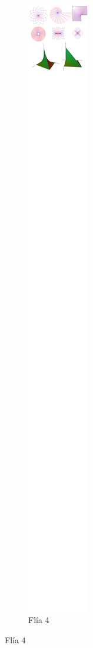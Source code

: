 \begin{figure}[t!]
~
\begin{subfigure}[t]{0.5\textwidth}
\centering
\includegraphics[scale=0.5,trim={10px 9612px 704px 352px},clip]{images/04_analisis2/am2.png}
\caption{Flía 4}
\end{subfigure}


\end{figure}
